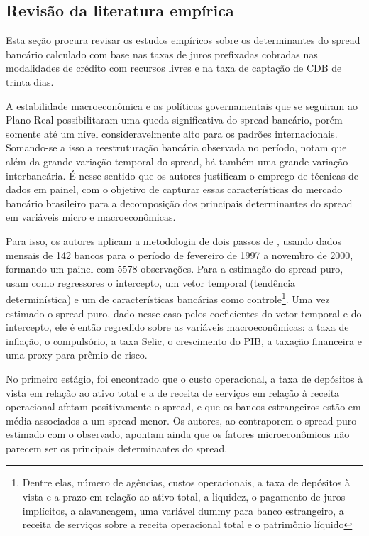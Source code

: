 \documentclass[a4paper,
               article,
               12pt,
               openany,
               oneside,
               english,
               brazil]{abntex2}
\numberwithin{equation}{section}
\begin{document}
\subsection{Revisão da literatura empírica}

    Esta seção procura revisar os estudos empíricos sobre os determinantes do spread bancário calculado com base nas taxas de juros prefixadas cobradas nas modalidades de crédito com recursos livres e na taxa de captação de CDB de trinta dias.

    A estabilidade macroeconômica e as políticas governamentais que se seguiram ao Plano Real possibilitaram uma queda significativa do spread bancário, porém somente até um nível consideravelmente alto para os padrões internacionais. Somando-se a isso a reestruturação bancária observada no período, \textcite{afanasieff02} notam que além da grande variação temporal do spread, há também uma grande variação interbancária. É nesse sentido que os autores justificam o emprego de técnicas de dados em painel, com o objetivo de capturar essas características do mercado bancário brasileiro para a decomposição dos principais determinantes do spread em variáveis micro e macroeconômicas.

    Para isso, os autores aplicam a metodologia de dois passos de \textcite{hoesaunders}, usando dados mensais de 142 bancos para o período de fevereiro de 1997 a novembro de 2000, formando um painel com 5578 observações. Para a estimação do spread puro, usam como regressores o intercepto, um vetor temporal (tendência determinística) e um de características bancárias como controle\footnote{Dentre elas, número de agências, custos operacionais, a taxa de depósitos à vista e a prazo em relação ao ativo total, a liquidez, o pagamento de juros implícitos, a alavancagem, uma variável dummy para banco estrangeiro, a receita de serviços sobre a receita operacional total e o patrimônio líquido}. Uma vez estimado o spread puro, dado nesse caso pelos coeficientes do vetor temporal e do intercepto, ele é então regredido sobre as variáveis macroeconômicas: a taxa de inflação, o compulsório, a taxa Selic, o crescimento do PIB, a taxação financeira e uma proxy para prêmio de risco.

    No primeiro estágio, foi encontrado que o custo operacional, a taxa de depósitos à vista em relação ao ativo total e a de receita de serviços em relação à receita operacional afetam positivamente o spread, e que os bancos estrangeiros estão em média associados a um spread menor. Os autores, ao contraporem o spread puro estimado com o observado, apontam ainda que os fatores microeconômicos não parecem ser os principais determinantes do spread.
    
\end{document}
